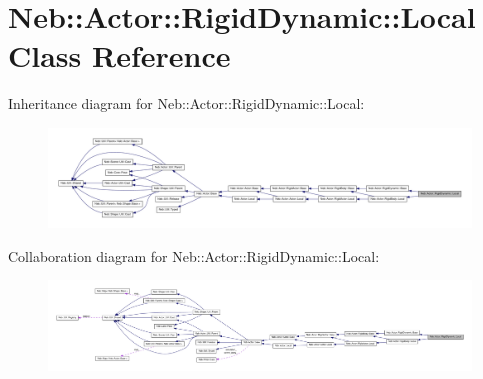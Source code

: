 \hypertarget{classNeb_1_1Actor_1_1RigidDynamic_1_1Local}{\section{\-Neb\-:\-:\-Actor\-:\-:\-Rigid\-Dynamic\-:\-:\-Local \-Class \-Reference}
\label{classNeb_1_1Actor_1_1RigidDynamic_1_1Local}
}


\-Inheritance diagram for \-Neb\-:\-:\-Actor\-:\-:\-Rigid\-Dynamic\-:\-:\-Local\-:\nopagebreak
\begin{figure}[H]
\begin{center}
\leavevmode
\includegraphics[width=350pt]{classNeb_1_1Actor_1_1RigidDynamic_1_1Local__inherit__graph}
\end{center}
\end{figure}


\-Collaboration diagram for \-Neb\-:\-:\-Actor\-:\-:\-Rigid\-Dynamic\-:\-:\-Local\-:\nopagebreak
\begin{figure}[H]
\begin{center}
\leavevmode
\includegraphics[width=350pt]{classNeb_1_1Actor_1_1RigidDynamic_1_1Local__coll__graph}
\end{center}
\end{figure}
